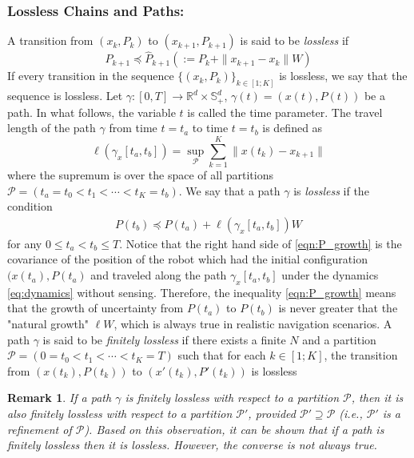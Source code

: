 \documentclass[Afour,sageh,times]{sagej}
\newtheorem{remark}{\bf Remark}
\begin{document}
\subsubsection{Lossless Chains and Paths:}
A transition from $(x_k, P_k)$ to $(x_{k+1}, P_{k+1})$ is said to be \emph{lossless} if
\begin{equation}
P_{k+1} \preceq \hat{P}_{k+1}(:=P_k+\|x_{k+1}-x_k\|W)
\end{equation}
If every transition in the sequence $\{(x_k, P_k)\}_{k\in[1;K]}$ is lossless, we say that the sequence is lossless.
Let $\gamma: [0,T]\rightarrow \mathbb{R}^d\times \mathbb{S}_{+}^d$, $\gamma(t)=(x(t), P(t))$ be a path. In what follows, the variable $t$ is called the time parameter.
The {travel length} of the path $\gamma$ from time $t=t_a$ to time $t=t_b$ is defined as
\[
\ell(\gamma_x[t_a, t_b])=\sup_{\mathcal{P}} \sum_{k=1}^K \|x(t_k)-x_{k+1}\|
\]
where the supremum is over the space of all partitions $\mathcal{P}=(t_a=t_0<t_1<\cdots < t_K=t_b)$. We say that a path $\gamma$ is \emph{lossless} if the condition
\begin{align}
P(t_b) \preceq P(t_a)+\ell(\gamma_x[t_a, t_b])W
\label{eqn:P_growth}
\end{align}
for any $0\leq t_a < t_b \leq T$. Notice that the right hand side of \eqref{eqn:P_growth} is the covariance of the position of the robot which had the initial configuration $(x(t_a),P(t_a)$ and traveled along the path $\gamma_x[t_a, t_b]$ under the dynamics \eqref{eq:dynamics} without sensing. Therefore, the inequality \eqref{eqn:P_growth} means that the growth of uncertainty from $P(t_a)$ to $P(t_b)$ is never greater that the "natural growth" $\ell W$, which is always true in realistic navigation scenarios. A path $\gamma$ is said to be \emph{finitely lossless} if there exists a finite $N$ and a partition $\mathcal{P}=(0=t_0<t_1<\cdots < t_K=T)$ such that for each $k\in[1;K]$, the transition from $(x(t_k), P(t_k))$ to $(x'(t_k), P'(t_k))$ is lossless


\begin{remark}
\normalfont If a path $\gamma$ is finitely lossless with respect to a partition $\mathcal{P}$, then it is also finitely lossless with respect to a partition $\mathcal{P}'$, provided $\mathcal{P}' \supseteq \mathcal{P}$ (i.e., $\mathcal{P}'$ is a refinement of $\mathcal{P}$). Based on this observation, it can be shown that if a path is finitely lossless then it is lossless. However, the converse is not always true.
\end{remark}
\end{document}
